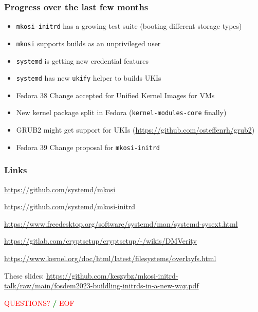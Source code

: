 \documentclass[]{beamer}
\newcommand\pp{}
\begin{document}
\begin{frame}
  \frametitle{Progress over the last few months}
  
  \begin{itemize}
  \item \texttt{mkosi-initrd} has a growing test suite (booting different storage types)
  \item \texttt{mkosi} supports builds as an unprivileged user
  \item \texttt{systemd} is getting new credential features
  \item \texttt{systemd} has new \texttt{ukify} helper to builds UKIs
  \item Fedora 38 Change accepted for Unified Kernel Images for VMs
  \item New kernel package split in Fedora (\texttt{kernel-modules-core} finally)
  \item GRUB2 might get support for UKIs (\url{https://github.com/osteffenrh/grub2})
  \item Fedora 39 Change proposal for \texttt{mkosi-initrd}
  \end{itemize}
\end{frame}
  





\begin{frame}[fragile]
  \frametitle{Links}

  \url{https://github.com/systemd/mkosi}

  \url{https://github.com/systemd/mkosi-initrd}

  \url{https://www.freedesktop.org/software/systemd/man/systemd-sysext.html}

  {
    \small
    \url{https://gitlab.com/cryptsetup/cryptsetup/-/wikis/DMVerity}\\
    }

  \url{https://www.kernel.org/doc/html/latest/filesystems/overlayfs.html}

  \quad

  These slides:
  \url{https://github.com/keszybz/mkosi-initrd-talk/raw/main/fosdem2023-buildling-initrds-in-a-new-way.pdf}

  \quad
  \pp

  \hfill \textcolor{red}{QUESTIONS?} \textcolor{green}{\bf /} \textcolor{red}{EOF} \hfill{}

\end{frame}
\end{document}
